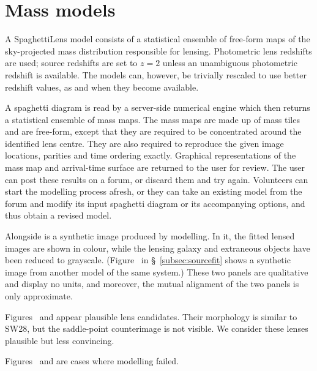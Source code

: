 \section{Mass models}\label{sec:massmodels}

A SpaghettiLens model consists of a statistical ensemble of free-form
maps of the sky-projected mass distribution responsible for lensing.
  Photometric lens
redshifts are used; source redshifts are set to $z=2$ unless an
unambiguous photometric redshift is available.  The models can,
however, be trivially rescaled to use better redshift values, as and
when they become available.

A spaghetti diagram is read by a server-side numerical engine
\citep[GLASS, developed by][]{2014MNRAS.445.2181C} which then returns
a statistical ensemble of mass maps.  The mass maps are made up of
mass tiles and are free-form, except that they are required to be
concentrated around the identified lens centre.  They are also
required to reproduce the given image locations, parities and time
ordering exactly.  Graphical representations of the mass map and
arrival-time surface are returned to the user for review.  The user
can post these results on a forum, or discard them and try again.
Volunteers can start the modelling process afresh, or they can take an
existing model from the forum and modify its input spaghetti diagram
or its accompanying options, and thus obtain a revised model.

Alongside is a synthetic image produced by modelling.  In it, the
fitted lensed images are shown in colour, while the lensing galaxy and
extraneous objects have been reduced to grayscale.
(Figure~ in \S~\ref{subsec:sourcefit} shows a
synthetic image from another model of the same system.) These two
panels are qualitative and display no units, and moreover, the mutual
alignment of the two panels is only approximate.

Figures~ and  appear plausible lens
candidates.  Their morphology is similar to SW28, but the saddle-point
counterimage is not visible.  We consider these lenses plausible but
less convincing.

Figures~ and  are cases where modelling
failed.

